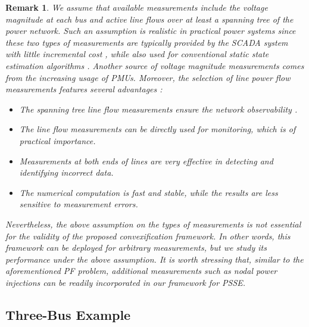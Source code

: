 \documentclass[journal,twoside]{IEEEtran}
\newtheorem{remark}{Remark}
\begin{document}
\begin{remark} \label{rem:r2}
We assume that available measurements include the voltage magnitude at each bus and active line flows over at least a spanning tree of the power network.
Such an assumption is realistic in practical power systems since these two types of measurements are typically provided by the SCADA system with little incremental cost \cite{Korres2011},
while also used for conventional static state estimation algorithms \cite{Phadke08}.
Another source of voltage magnitude measurements comes from the increasing usage of PMUs.
Moreover, the selection of line power flow measurements features several advantages \cite{Dopazo70,Porretta73}:
\begin{itemize}
 \item The spanning tree line flow measurements ensure the network observability \cite{Abur99,WuKK06}.
  \item The line flow measurements can be directly used  for monitoring, which is of practical importance.
  \item Measurements at both ends of lines are very effective in detecting and identifying incorrect data.
  \item The numerical computation is fast and stable, while the results are less sensitive to measurement errors.
\end{itemize}
Nevertheless, the above assumption on the types of measurements  is not essential for the validity of the proposed convexification framework. In other words, this framework can be deployed for arbitrary measurements, but we study its performance under the above assumption. It is worth stressing that, similar to the aforementioned PF problem, additional measurements such as nodal power injections 
can be readily incorporated in our framework for PSSE. 
\end{remark}




\subsection{Three-Bus Example}
\end{document}

